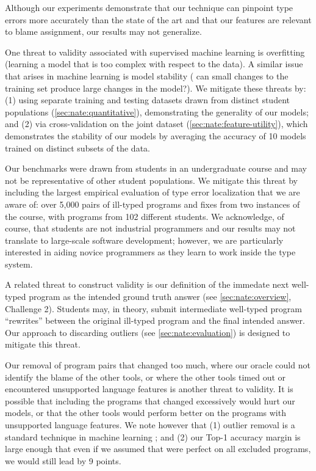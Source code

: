 \label{sec:nate:validity}

Although our experiments demonstrate that our technique can pinpoint type
errors more accurately than the state of the art and that our features are
relevant to blame assignment, our results may not generalize.

One threat to validity associated with supervised machine learning is
overfitting (\ie learning a model that is too complex with respect to
the data).
%
A similar issue that arises in machine learning is model stability (\ie
can small changes to the training set produce large changes in the model?).
%
We mitigate these threats by:
%
(1) using separate training and testing datasets drawn from distinct
student populations (\autoref{sec:nate:quantitative}), demonstrating the
generality of our models; and
%
(2) via cross-validation on the joint dataset
(\autoref{sec:nate:feature-utility}), which demonstrates the stability of our
models by averaging the accuracy of 10 models trained on distinct
subsets of the data.

Our benchmarks were drawn from students in an undergraduate course and
may not be representative of other student populations.
%
We mitigate this threat by including the largest empirical evaluation of
type error localization that we are aware of: over 5,000 pairs of
ill-typed programs and fixes from two instances of the course, with
programs from 102 different students.
%
We acknowledge, of course, that students are not industrial programmers
and our results may not translate to large-scale software development;
however, we are particularly interested in aiding novice programmers
as they learn to work inside the type system.

A related threat to construct validity is our definition of the immedate
next well-typed program as the intended ground truth answer (see
\autoref{sec:nate:overview}, Challenge 2). Students may, in theory, submit
intermediate well-typed program ``rewrites'' between the original ill-typed
program and the final intended answer. Our approach to discarding outliers
(see \autoref{sec:nate:evaluation}) is designed to mitigate this threat.

Our removal of program pairs that changed too much, where our oracle
could not identify the blame of the other tools, or where the other
tools timed out or encountered unsupported language features is another
threat to validity.
%
It is possible that including the programs that changed excessively
would hurt our models, or that the other tools would perform
better on the programs with unsupported language features.
%
We note however that
%
(1) outlier removal is a standard technique in machine learning%
; and
%
(2) our Top-1 accuracy margin is large enough that even if we assumed
that \sherrloc were perfect on all excluded programs,
we would still lead by 9 points.
%

